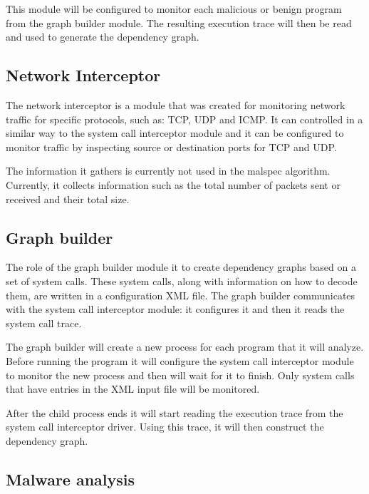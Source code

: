 This module will be configured to monitor each malicious or benign program from the graph builder module. The resulting execution trace will then be read and used to generate the dependency graph.

\subsection{Network Interceptor}

The network interceptor is a module that was created for monitoring network traffic for specific protocols, such as: TCP, UDP and ICMP. It can controlled in a similar way to the system call interceptor module and it can be configured to monitor traffic by inspecting source or destination ports for TCP and UDP.

The information it gathers is currently not used in the malspec algorithm. Currently, it collects information such as the total number of packets sent or received and their total size.

  

\subsection{Graph builder}

The role of the graph builder module it to create dependency graphs based on a set of system calls. These system calls, along with information on how to decode them, are written in a configuration XML file. The graph builder communicates with the system call interceptor module: it configures it and then it reads the system call trace.

The graph builder will create a new process for each program that it will analyze. Before running the program it will configure the system call interceptor module to monitor the new process and then will wait for it to finish. Only system calls that have entries in the XML input file will be monitored.

After the child process ends it will start reading the execution trace from the system call interceptor driver. Using this trace, it will then construct the dependency graph.

\subsection{Malware analysis}
 
